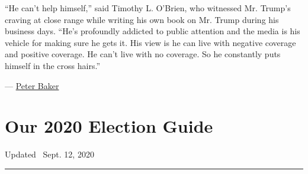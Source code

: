 ``He can't help himself,'' said Timothy L. O'Brien, who witnessed Mr.
Trump's craving at close range while writing his own book on Mr. Trump
during his business days. ``He's profoundly addicted to public attention
and the media is his vehicle for making sure he gets it. His view is he
can live with negative coverage and positive coverage. He can't live
with no coverage. So he constantly puts himself in the cross hairs.''

--- \href{https://www.nytimes3xbfgragh.onion/by/peter-baker}{Peter
Baker}

\hypertarget{our-2020-election-guide}{%
\section{Our 2020 Election Guide}\label{our-2020-election-guide}}

Updated ~Sept. 12, 2020

\begin{center}\rule{0.5\linewidth}{\linethickness}\end{center}

